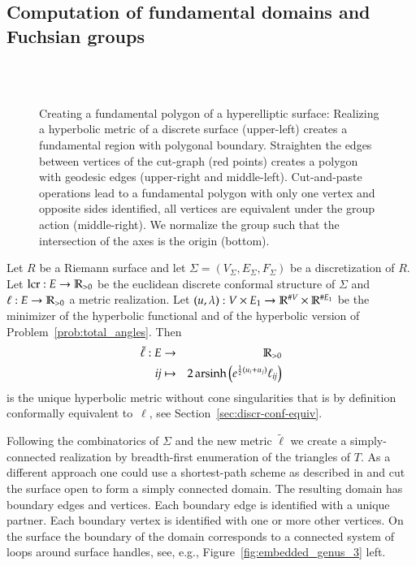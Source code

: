\documentclass[Thesis]{subfiles}
\begin{document}
\subsection{Computation of fundamental domains and Fuchsian groups}
\label{sec:fundamental_domains}

\begin{figure}
\centering
{}\\
\\
\caption{
Creating a fundamental polygon of a hyperelliptic surface:
Realizing a hyperbolic metric of a discrete surface (upper-left) creates a fundamental region with polygonal boundary.
Straighten the edges between vertices of the cut-graph (red points) creates a polygon with geodesic edges (upper-right and middle-left).
Cut-and-paste operations lead to a fundamental polygon with only one vertex and opposite sides identified, all vertices are equivalent under the group action (middle-right).
We normalize the group such that the intersection of the axes is the origin (bottom).
}
\label{fig:fundamental_polygon_algorithm}
\end{figure}

Let $R$ be a Riemann surface and let $\Sigma=(V_{\Sigma}, E_{\Sigma}, F_{\Sigma})$ be a discretization of $R$. 
Let $\operatorname{lcr} :E\to \mathbb R_{>0}$ be the euclidean discrete conformal structure of $\Sigma$ and $\ell:E\to \mathbb R_{>0}$ a metric realization. 
Let $(u, \lambda):V\times E_1\to \mathbb R^{\#V}\times\mathbb R^{\# E_1}$ be the minimizer of the hyperbolic functional and of the hyperbolic version of Problem~\ref{prob:total_angles}.
Then 
\begin{eqnarray}
\tilde \ell:E &\to& \mathbb R_{>0}\\
{\it ij}&\mapsto& 2\operatorname{arsinh}\left(e^{\frac{1}{2}(u_i+u_j)}\ell_{\it ij}\right)
\end{eqnarray}
is the unique hyperbolic metric without cone singularities that is by definition conformally equivalent to~$\ell$, see Section~\ref{sec:discr-conf-equiv}.

Following the combinatorics of $\Sigma$ and the new metric $\tilde \ell$ we create a simply-connected realization by breadth-first enumeration of the triangles of $T$. 
As a different approach one could use a shortest-path scheme as described in \cite{EricksonH02} and cut the surface open to form a simply connected domain.  
The resulting domain has boundary edges and vertices. 
Each boundary edge is identified with a unique partner. 
Each boundary vertex is identified with one or more other vertices. 
On the surface the boundary of the domain corresponds to a connected system of loops around surface handles, see, e.g., Figure~\ref{fig:embedded_genus_3} left.
\end{document}
